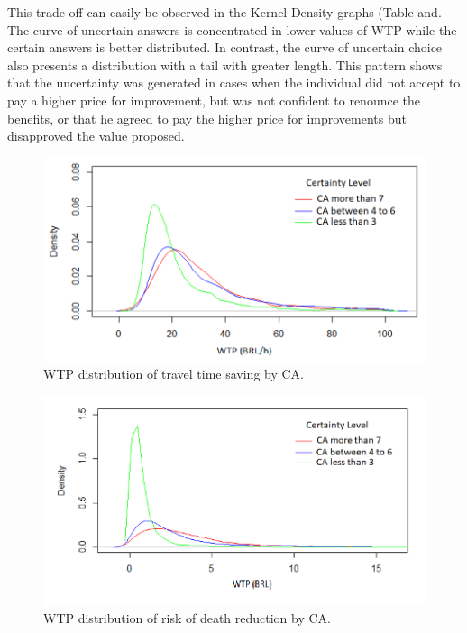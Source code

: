 \documentclass[]{elsarticle} %
\makeatletter
\def\maxwidth{\ifdim\Gin@nat@width>\linewidth\linewidth
\else\Gin@nat@width\fi}
\let\Oldincludegraphics\includegraphics
\renewcommand{\includegraphics}[1]{\Oldincludegraphics[width=\maxwidth]{#1}}
\makeatother
\begin{document}
This trade-off can easily be observed in the Kernel Density graphs
(Table and. The curve of uncertain answers is concentrated in lower
values of WTP while the certain answers is better distributed. In
contrast, the curve of uncertain choice also presents a distribution
with a tail with greater length. This pattern shows that the uncertainty
was generated in cases when the individual did not accept to pay a
higher price for improvement, but was not confident to renounce the
benefits, or that he agreed to pay the higher price for improvements but
disapproved the value proposed.

\begin{figure}
\centering
\includegraphics{dist_WTP_CAtime.png}
\caption{WTP distribution of travel time saving by CA.}
\end{figure}

\begin{figure}
\centering
\includegraphics{dist_WTP_CArisk.png}
\caption{WTP distribution of risk of death reduction by CA.}
\end{figure}
\end{document}
